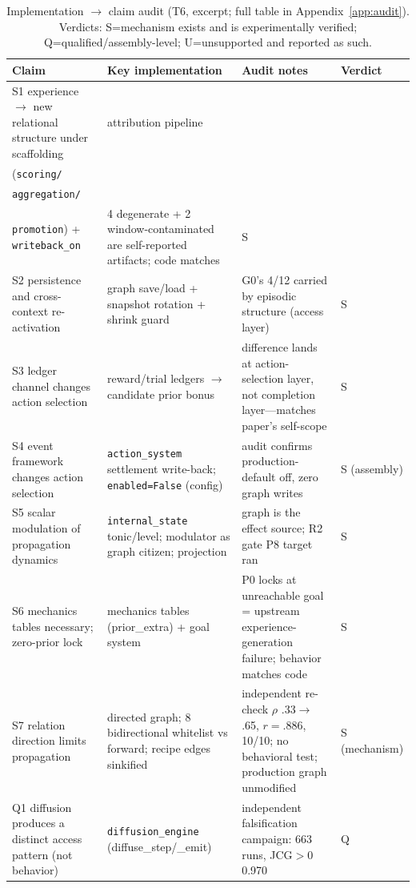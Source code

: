 \documentclass[10pt,a4paper]{article}
\begin{document}
\begin{table}[t]
\centering\small
\caption{Implementation $\rightarrow$ claim audit (T6, excerpt; full table in Appendix~\ref{app:audit}). Verdicts: S=mechanism exists and is experimentally verified; Q=qualified/assembly-level; U=unsupported and reported as such.}
\label{tab:audit}
\begin{tabular}{L{4.6cm}L{3.2cm}L{3.6cm}L{1.7cm}}
\toprule
\textbf{Claim} & \textbf{Key implementation} & \textbf{Audit notes} & \textbf{Verdict} \\
\midrule
S1 experience $\rightarrow$ new relational structure under scaffolding & attribution pipeline\\ (\texttt{scoring/}\\ \texttt{aggregation/}\\ \texttt{promotion}) + \texttt{writeback\_on} & 4 degenerate + 2 window-contaminated are self-reported artifacts; code matches & S \\
S2 persistence and cross-context re-activation & graph save/load + snapshot rotation + shrink guard & G0's 4/12 carried by episodic structure (access layer) & S \\
S3 ledger channel changes action selection & reward/trial ledgers $\rightarrow$ candidate prior bonus & difference lands at action-selection layer, not completion layer---matches paper's self-scope & S \\
S4 event framework changes action selection & \texttt{action\_system} settlement write-back; \texttt{enabled=False} (config) & audit confirms production-default off, zero graph writes & S (assembly) \\
S5 scalar modulation of propagation dynamics & \texttt{internal\_state} tonic/level; modulator as graph citizen; projection & graph is the effect source; R2 gate P8 target ran & S \\
S6 mechanics tables necessary; zero-prior lock & mechanics tables (prior\_extra) + goal system & P0 locks at unreachable goal = upstream experience-generation failure; behavior matches code & S \\
S7 relation direction limits propagation & directed graph; 8 bidirectional whitelist vs forward; recipe edges sinkified & independent re-check $\rho$ .33$\rightarrow$.65, $r{=}.886$, 10/10; no behavioral test; production graph unmodified & S (mechanism) \\
Q1 diffusion produces a distinct access pattern (not behavior) & \texttt{diffusion\_engine} (diffuse\_step/\_emit) & independent falsification campaign: 663 runs, JCG$>$0 0.970 & Q \\

\end{tabular}
\end{table}
\end{document}
